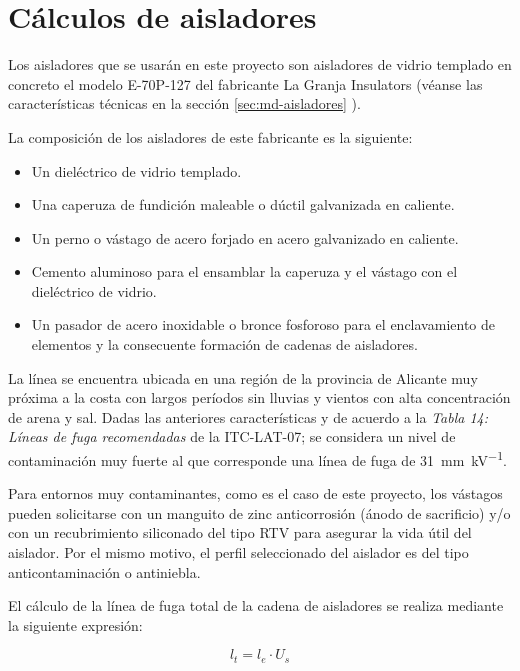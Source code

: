 \section{Cálculos de aisladores}
\label{sec:mc-aisladores}
Los aisladores que se usarán en este proyecto son aisladores de vidrio templado en concreto el modelo E-70P-127 del fabricante La Granja Insulators (véanse las características técnicas en la sección \ref{sec:md-aisladores} ).

La composición de los aisladores de este fabricante es la siguiente:
\begin{itemize}
    \item Un dieléctrico de vidrio templado.
    \item Una caperuza de fundición maleable o dúctil galvanizada en caliente.
    \item Un perno o vástago de acero forjado en acero galvanizado en caliente.
    \item Cemento aluminoso para el ensamblar la caperuza y el vástago con el dieléctrico de vidrio.
    \item Un pasador de acero inoxidable o bronce fosforoso para el enclavamiento de elementos y la consecuente formación de cadenas de aisladores.
\end{itemize}

La línea se encuentra ubicada en una región de la provincia de Alicante muy próxima a la costa con largos períodos sin lluvias y vientos con alta concentración de arena y sal. Dadas las anteriores características y de acuerdo a la \textit{Tabla 14: Líneas de fuga recomendadas} de la ITC-LAT-07; se considera un nivel de contaminación muy fuerte al que corresponde una línea de fuga de \SI{31}{\milli\meter\per\kilo\volt}.

Para entornos muy contaminantes, como es el caso de este proyecto, los vástagos pueden solicitarse con un manguito de zinc anticorrosión (ánodo de sacrificio) y/o con un recubrimiento siliconado del tipo \ac{RTV} para asegurar la vida útil del aislador. Por el mismo motivo, el perfil seleccionado del aislador es del tipo anticontaminación o antiniebla.

El cálculo de la línea de fuga total de la cadena de aisladores se realiza mediante la siguiente expresión:

\begin{equation}
    l_t=l_e \cdot U_s
    \label{eq:linea-fuga-cadena}
\end{equation}

